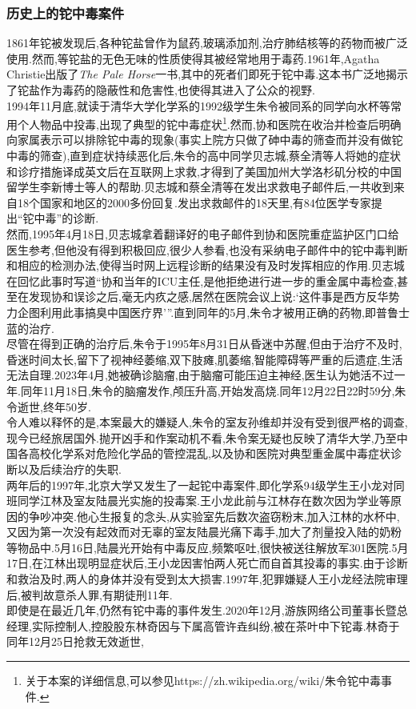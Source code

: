 \documentclass{ctexart}
\begin{document}
\subsubsection{历史上的铊中毒案件}
1861年铊被发现后,各种铊盐曾作为鼠药,玻璃添加剂,治疗肺结核等的药物而被广泛使用.然而,等铊盐的无色无味的性质使得其被经常地用于毒药.1961年,Agatha Christie出版了\textit{The Pale Horse}一书,其中的死者们即死于铊中毒.这本书广泛地揭示了铊盐作为毒药的隐蔽性和危害性,也使得其进入了公众的视野.\\
\indent 1994年11月底,就读于清华大学化学系的1992级学生朱令被同系的同学向水杯等常用个人物品中投毒,出现了典型的铊中毒症状\footnote{关于本案的详细信息,可以参见https://zh.wikipedia.org/wiki/朱令铊中毒事件.}.然而,协和医院在收治并检查后明确向家属表示可以排除铊中毒的现象(事实上院方只做了砷中毒的筛查而并没有做铊中毒的筛查),直到症状持续恶化后,朱令的高中同学贝志城,蔡全清等人将她的症状和诊疗措施译成英文后在互联网上求救,才得到了美国加州大学洛杉矶分校的中国留学生李新博士等人的帮助.贝志城和蔡全清等在发出求救电子邮件后,一共收到来自18个国家和地区的2000多份回复.发出求救邮件的18天里,有84位医学专家提出“铊中毒”的诊断.\\
\indent 然而,1995年4月18日,贝志城拿着翻译好的电子邮件到协和医院重症监护区门口给医生参考,但他没有得到积极回应,很少人参看,也没有采纳电子邮件中的铊中毒判断和相应的检测办法,使得当时网上远程诊断的结果没有及时发挥相应的作用.贝志城在回忆此事时写道“协和当年的ICU主任,是他拒绝进行进一步的重金属中毒检查,甚至在发现协和误诊之后,毫无内疚之感,居然在医院会议上说:‘这件事是西方反华势力企图利用此事搞臭中国医疗界’”.直到同年的5月,朱令才被用正确的药物,即普鲁士蓝的治疗.\\
\indent 尽管在得到正确的治疗后,朱令于1995年8月31日从昏迷中苏醒,但由于治疗不及时,昏迷时间太长,留下了视神经萎缩,双下肢瘫,肌萎缩,智能障碍等严重的后遗症,生活无法自理.2023年4月,她被确诊脑瘤,由于脑瘤可能压迫主神经,医生认为她活不过一年.同年11月18日,朱令的脑瘤发作,颅压升高,开始发高烧.同年12月22日22时59分,朱令逝世,终年50岁.\\
\indent 令人难以释怀的是,本案最大的嫌疑人,朱令的室友孙维却并没有受到很严格的调查,现今已经旅居国外.抛开凶手和作案动机不看,朱令案无疑也反映了清华大学,乃至中国各高校化学系对危险化学品的管控混乱,以及协和医院对典型重金属中毒症状诊断以及后续治疗的失职.\\
\indent 两年后的1997年,北京大学又发生了一起铊中毒案件,即化学系94级学生王小龙对同班同学江林及室友陆晨光实施的投毒案.王小龙此前与江林存在数次因为学业等原因的争吵冲突.他心生报复的念头,从实验室先后数次盗窃粉末,加入江林的水杯中,又因为第一次没有起效而对无辜的室友陆晨光痛下毒手,加大了剂量投入陆的奶粉等物品中.5月16日,陆晨光开始有中毒反应,频繁呕吐,很快被送往解放军301医院.5月17日,在江林出现明显症状后,王小龙因害怕两人死亡而自首其投毒的事实.由于诊断和救治及时,两人的身体并没有受到太大损害.1997年,犯罪嫌疑人王小龙经法院审理后,被判故意杀人罪,有期徒刑11年.\\
\indent 即使是在最近几年,仍然有铊中毒的事件发生.2020年12月,游族网络公司董事长暨总经理,实际控制人,控股股东林奇因与下属高管许垚纠纷,被在茶叶中下铊毒.林奇于同年12月25日抢救无效逝世,
\end{document}
